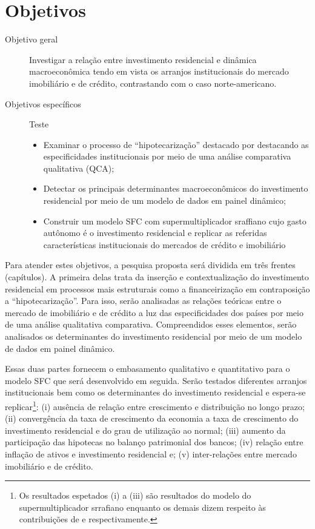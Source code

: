\section{Objetivos}\label{OBJ}


\begin{description}
	\item[Objetivo geral] Investigar a relação entre investimento residencial e dinâmica macroeconômica tendo em vista os arranjos institucionais do mercado imobiliário e de crédito, contrastando com o caso norte-americano.
	\item[Objetivos específicos] {\color{white}Teste}
	\begin{itemize}
		\item Examinar o processo de ``hipotecarização'' destacado por \textcite{jorda_great_2014} destacando as especificidades institucionais por meio de uma análise comparativa qualitativa (QCA);
		\item  Detectar os principais determinantes macroeconômicos do investimento residencial por meio de um modelo de dados em painel dinâmico;
		\item Construir um modelo SFC com supermultiplicador sraffiano cujo gasto autônomo é o investimento residencial e replicar as referidas características institucionais do mercados de crédito e imobiliário
	\end{itemize}
\end{description}


Para atender estes objetivos, a pesquisa proposta será dividida em três frentes (capítulos).
A primeira delas trata da inserção e contextualização do investimento residencial em processos mais estruturais como a financeirização em contraposição a ``hipotecarização''. 
Para isso, serão analisadas as relações teóricas entre o mercado de imobiliário e de crédito a luz das especificidades dos países por meio de uma análise qualitativa comparativa. Compreendidos esses elementos, serão analisados os determinantes do investimento residencial por meio de um modelo de dados em painel dinâmico. 

Essas duas partes fornecem o embasamento qualitativo e quantitativo para o modelo SFC que será desenvolvido em seguida. Serão testados diferentes arranjos institucionais bem como os determinantes do investimento residencial e espera-se replicar\footnote{Os resultados espetados (i) a (iii) são resultados do modelo do supermultiplicador srrafiano enquanto os demais dizem respeito às contribuições de \textcite{teixeira_crescimento_2015} e \textcite{jorda_great_2014} respectivamente.}: 
	(i) ausência de relação entre crescimento e distribuição no longo prazo; 
	(ii) convergência da taxa de crescimento da economia a taxa de crescimento do investimento residencial e do grau de utilização ao normal; 
	(iii) aumento da participação das hipotecas no balanço patrimonial dos bancos;
	(iv) relação entre inflação de ativos e investimento residencial e; 
	(v) inter-relações entre mercado imobiliário e de crédito. 


